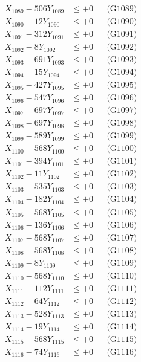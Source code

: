 \documentclass[a4paper,10pt]{article}
\begin{document}
{\begin{align}
X_{1089} - 506Y_{1089} &\leq +0 && \text{(G1089)} \\
X_{1090} - 12Y_{1090} &\leq +0 && \text{(G1090)} \\
\allowbreak
X_{1091} - 312Y_{1091} &\leq +0 && \text{(G1091)} \\
X_{1092} - 8Y_{1092} &\leq +0 && \text{(G1092)} \\
X_{1093} - 691Y_{1093} &\leq +0 && \text{(G1093)} \\
X_{1094} - 15Y_{1094} &\leq +0 && \text{(G1094)} \\
X_{1095} - 427Y_{1095} &\leq +0 && \text{(G1095)} \\
X_{1096} - 547Y_{1096} &\leq +0 && \text{(G1096)} \\
X_{1097} - 697Y_{1097} &\leq +0 && \text{(G1097)} \\
X_{1098} - 697Y_{1098} &\leq +0 && \text{(G1098)} \\
X_{1099} - 589Y_{1099} &\leq +0 && \text{(G1099)} \\
X_{1100} - 568Y_{1100} &\leq +0 && \text{(G1100)} \\
\allowbreak
X_{1101} - 394Y_{1101} &\leq +0 && \text{(G1101)} \\
X_{1102} - 11Y_{1102} &\leq +0 && \text{(G1102)} \\
X_{1103} - 535Y_{1103} &\leq +0 && \text{(G1103)} \\
X_{1104} - 182Y_{1104} &\leq +0 && \text{(G1104)} \\
X_{1105} - 568Y_{1105} &\leq +0 && \text{(G1105)} \\
X_{1106} - 136Y_{1106} &\leq +0 && \text{(G1106)} \\
X_{1107} - 568Y_{1107} &\leq +0 && \text{(G1107)} \\
X_{1108} - 568Y_{1108} &\leq +0 && \text{(G1108)} \\
X_{1109} - 8Y_{1109} &\leq +0 && \text{(G1109)} \\
X_{1110} - 568Y_{1110} &\leq +0 && \text{(G1110)} \\
\allowbreak
X_{1111} - 112Y_{1111} &\leq +0 && \text{(G1111)} \\
X_{1112} - 64Y_{1112} &\leq +0 && \text{(G1112)} \\
X_{1113} - 528Y_{1113} &\leq +0 && \text{(G1113)} \\
X_{1114} - 19Y_{1114} &\leq +0 && \text{(G1114)} \\
X_{1115} - 568Y_{1115} &\leq +0 && \text{(G1115)} \\
X_{1116} - 74Y_{1116} &\leq +0 && \text{(G1116)} \\

\end{align}}
\end{document}
